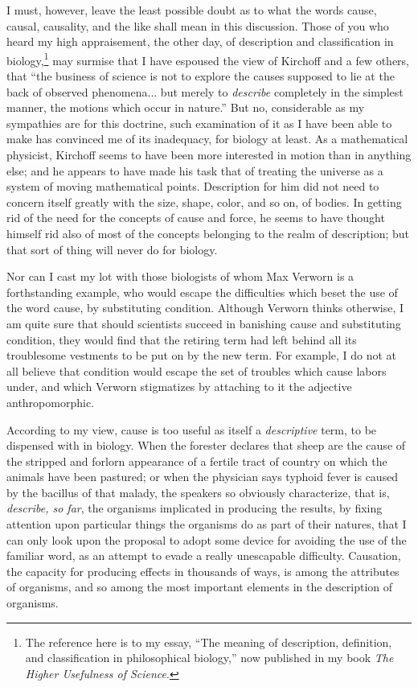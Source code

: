 \documentclass[a4paper, 11pt, oneside, polutonikogreek, english]{article}
\begin{document}
I must, however, leave the least possible doubt as to what the words cause, causal, causality, and the like shall mean in this discussion. Those of you who heard my high appraisement, the other day, of description and classification in biology,\footnote{The reference here is to my essay, ``The meaning of description, definition, and classification in philosophical biology,'' now published in my book \emph{The Higher Usefulness of Science}.} may surmise that I have espoused the view of Kirchoff and a few others, that ``the business of science is not to explore the causes supposed to lie at the back of observed phenomena... but merely to \emph{describe} completely in the simplest manner, the motions which occur in nature.'' But no, considerable as my sympathies are for this doctrine, such examination of it as I have been able to make has convinced me of its inadequacy, for biology at least. As a mathematical physicist, Kirchoff seems to have been more interested in motion than in anything else; and he appears to have made his task that of treating the universe as a system of moving mathematical points. Description for him did not need to concern itself greatly with the size, shape, color, and so on, of bodies. In getting rid of the need for the concepts of cause and force, he seems to have thought himself rid also of most of the concepts belonging to the realm of description; but that sort of thing will never do for biology.

Nor can I cast my lot with those biologists of whom Max Verworn is a forthstanding example, who would escape the difficulties which beset the use of the word cause, by substituting condition. Although Verworn thinks otherwise, I am quite sure that should scientists succeed in banishing cause and substituting condition, they would find that the retiring term had left behind all its troublesome vestments to be put on by the new term. For example, I do not at all believe that condition would escape the set of troubles which cause labors under, and which Verworn stigmatizes by attaching to it the adjective anthropomorphic.

According to my view, cause is too useful as itself a \emph{descriptive} term, to be dispensed with in biology. When the forester declares that sheep are the cause of the stripped and forlorn appearance of a fertile tract of country on which the animals have been pastured; or when the physician says typhoid fever is caused by the bacillus of that malady, the speakers so obviously characterize, that is, \emph{describe, so far}, the organisms implicated in producing the results, by fixing attention upon particular things the organisms do as part of their natures, that I can only look upon the proposal to adopt some device for avoiding the use of the familiar word, as an attempt to evade a really unescapable difficulty. Causation, the capacity for producing effects in thousands of ways, is among the attributes of organisms, and so among the most important elements in the description of organisms.
\end{document}
